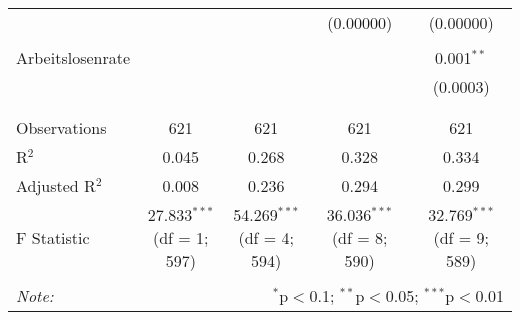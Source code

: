 \begin{table}[!htbp]
\begin{tabular}{@{\extracolsep{5pt}}lcccc}
  &  &  & (0.00000) & (0.00000) \\ 
  & & & & \\ 
 Arbeitslosenrate &  &  &  & 0.001$^{**}$ \\ 
  &  &  &  & (0.0003) \\ 
  & & & & \\ 
\hline \\[-1.8ex] 
Observations & 621 & 621 & 621 & 621 \\ 
R$^{2}$ & 0.045 & 0.268 & 0.328 & 0.334 \\ 
Adjusted R$^{2}$ & 0.008 & 0.236 & 0.294 & 0.299 \\ 
F Statistic & 27.833$^{***}$ (df = 1; 597) & 54.269$^{***}$ (df = 4; 594) & 36.036$^{***}$ (df = 8; 590) & 32.769$^{***}$ (df = 9; 589) \\ 
\hline 
\hline \\[-1.8ex] 
\textit{Note:}  & \multicolumn{4}{r}{$^{*}$p$<$0.1; $^{**}$p$<$0.05; $^{***}$p$<$0.01} \\ 
\end{tabular} 
\end{table} 
